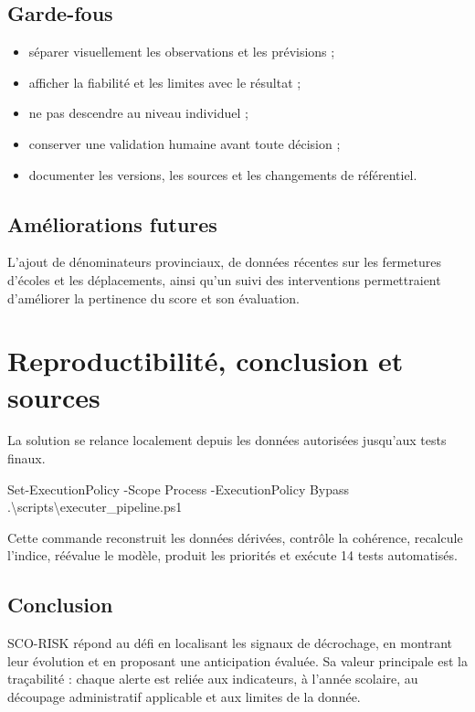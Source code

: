 \documentclass[12pt,a4paper]{article}
\begin{document}
\subsection{Garde-fous}
\begin{itemize}
  \item séparer visuellement les observations et les prévisions ;
  \item afficher la fiabilité et les limites avec le résultat ;
  \item ne pas descendre au niveau individuel ;
  \item conserver une validation humaine avant toute décision ;
  \item documenter les versions, les sources et les changements de référentiel.
\end{itemize}

\subsection{Améliorations futures}
L'ajout de dénominateurs provinciaux, de données récentes sur les fermetures d'écoles et les déplacements, ainsi qu'un suivi des interventions permettraient d'améliorer la pertinence du score et son évaluation.
\clearpage
\thispagestyle{fancy}

\section{Reproductibilité, conclusion et sources}
La solution se relance localement depuis les données autorisées jusqu'aux tests finaux.

\begin{center}
\colorbox{Pale}{\parbox{0.9\textwidth}{\ttfamily
Set-ExecutionPolicy -Scope Process -ExecutionPolicy Bypass\\
.\textbackslash scripts\textbackslash executer\_pipeline.ps1
}}
\end{center}

Cette commande reconstruit les données dérivées, contrôle la cohérence, recalcule l'indice, réévalue le modèle, produit les priorités et exécute 14 tests automatisés.

\subsection{Conclusion}
SCO-RISK répond au défi en localisant les signaux de décrochage, en montrant leur évolution et en proposant une anticipation évaluée. Sa valeur principale est la traçabilité : chaque alerte est reliée aux indicateurs, à l'année scolaire, au découpage administratif applicable et aux limites de la donnée.
\end{document}
